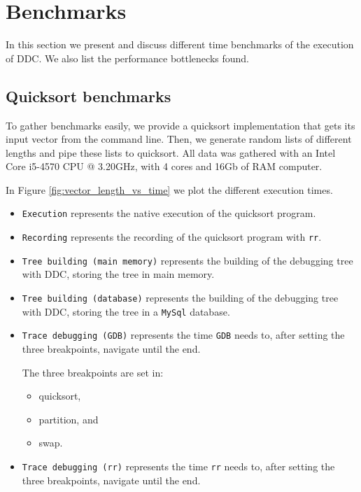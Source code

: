 
\section{Benchmarks}
In this section we present and discuss different time benchmarks of the execution of DDC. We also list the performance bottlenecks found.

\subsection{Quicksort benchmarks}
To gather benchmarks easily, we provide a quicksort implementation that gets its input vector from the command line.
Then, we generate random lists of different lengths and pipe these lists to quicksort. All data was gathered with an Intel Core i5-4570 CPU @ 3.20GHz, with 4 cores and 16Gb of RAM computer.

In Figure \ref{fig:vector_length_vs_time} we plot the different execution times.

\begin{itemize}
    \item \verb|Execution| represents the native execution of the quicksort program.
    \item \verb|Recording| represents the recording of the quicksort program with \verb|rr|.
    \item \verb|Tree building (main memory)| represents the building of the debugging tree with DDC, storing the tree in main memory.
    \item \verb|Tree building (database)| represents the building of the debugging tree with DDC, storing the tree in a \verb|MySql| database.
    \item \verb|Trace debugging (GDB)| represents the time \verb|GDB| needs to, after setting the three breakpoints, navigate until the end.
    
    The three breakpoints are set in:
    \begin{itemize}
        \item quicksort,
        \item partition, and
        \item swap.
    \end{itemize}
    \item \verb|Trace debugging (rr)| represents the time \verb|rr| needs to, after setting the three breakpoints, navigate until the end.
\end{itemize}

